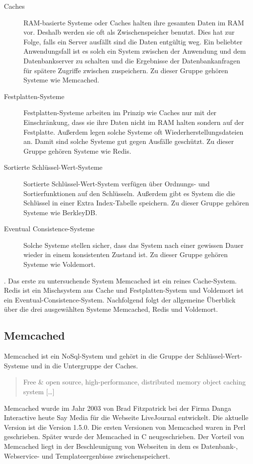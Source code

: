 \begin{description}
    \item[Caches] \gls{RAM}-basierte Systeme oder Caches halten ihre gesamten
        Daten im \gls{RAM} vor. Deshalb werden sie oft als Zwischenspeicher
        benutzt. Dies hat zur Folge, falls ein Server ausfällt sind die Daten
        entgültig weg. Ein beliebter Anwendungsfall ist es solch ein System
        zwischen der Anwendung und dem Datenbankserver zu schalten und die
        Ergebnisse der Datenbankanfragen für spätere Zugriffe zwischen
        zuspeichern. Zu dieser Gruppe gehören Systeme wie Memcached.
    \item[Festplatten-Systeme] Festplatten-Systeme arbeiten im Prinzip wie Caches
        nur mit der Einschränkung, dass sie ihre Daten nicht im \gls{RAM} halten
        sondern auf der Festplatte. Außerdem legen solche Systeme oft
        Wiederherstellungsdateien an. Damit sind solche Systeme gut gegen
        Ausfälle geschützt. Zu dieser Gruppe gehören Systeme wie Redis.
    \item[Sortierte Schlüssel-Wert-Systeme] Sortierte Schlüssel-Wert-System
        verfügen über Ordnungs- und Sortierfunktionen auf den Schlüsseln.
        Außerdem gibt es System die die Schlüssel in einer Extra Index-Tabelle
        speichern. Zu dieser Gruppe gehören Systeme wie BerkleyDB.
    \item[Eventual Consistence-Systeme] Solche Systeme stellen sicher, dass das
        System nach einer gewissen Dauer wieder in einem konsistenten Zustand
        ist. Zu dieser Gruppe gehören Systeme wie Voldemort.
\end{description}

. Das erste zu untersuchende System Memcached ist ein reines Cache-System.
Redis ist ein Mischsystem aus Cache und Festplatten-System und Voldemort ist
ein Eventual-Consistence-System. Nachfolgend folgt der allgemeine Überblick über
die drei ausgewählten Systeme Memcached, Redis und Voldemort.

\subsection{Memcached}
Memcached ist ein NoSql-System und gehört in die Gruppe der
Schlüssel-Wert-Systeme und in die Untergruppe der Caches.

\foreignblockquote{english}[\cite{Memcached2015}]{Free \& open source,
high-performance, distributed memory object caching system [\ldots]}

Memcached wurde im Jahr 2003 von Brad Fitzpatrick bei der Firma Danga
Interactive heute Say Media für die Webseite LiveJournal entwickelt. Die
aktuelle Version ist die Version 1.5.0. Die ersten Versionen von Memcached
waren in Perl geschrieben. Später wurde der Memcached in C neugeschrieben. Der
Vorteil von Memcached liegt in der Beschleunigung von Webseiten in dem es
Datenbank-, Webservice- und Templateergenbisse zwischenspeichert.

